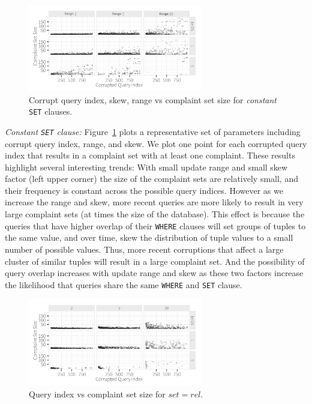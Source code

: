 \begin{figure}[h]
\centering
\includegraphics[width = 3in]{figures/qidxsimulation/qidx_v_ncomplaints_20attrs_const}
\caption{Corrupt query index, skew, range vs complaint set size for \textit{constant} \texttt{SET} clauses.}
\label{f:qidx_v_ncomplaints_const} 
\end{figure}

\smallskip
\emph{Constant \texttt{SET} clause: } Figure~\ref{f:qidx_v_ncomplaints_const} plots a representative set of parameters including corrupt query index, range, and skew. We plot one point
for each corrupted query index that results in a complaint set with at least one complaint. 
These results highlight several interesting trends:  With small update range and small skew factor (left upper corner)
the size of the complaint sets are relatively small, and their frequency is constant across the possible query indices.
However as we increase the range and skew, more recent queries are more likely to result in very large complaint sets (at times the size of the database).   
This effect is because the queries that have higher overlap of their \texttt{WHERE} clauses will set groups of tuples to the same value,
and over time, skew the distribution of tuple values to a small number of possible values. 
Thus, more recent corruptions that affect a large cluster of similar tuples will result in a large complaint set.
And the possibility of query overlap increases with update range and skew as these two factors increase the likelihood that queries share the same \texttt{WHERE} and \texttt{SET} clause. 



\begin{figure}[t]
\centering
\includegraphics[width = 3in]{figures/qidxsimulation/qidx_v_ncomplaints_20attrs_rel}
\caption{Query index vs complaint set size for $set = rel$.}
\label{f:qidx_v_ncomplaints_rel} 
\end{figure}

